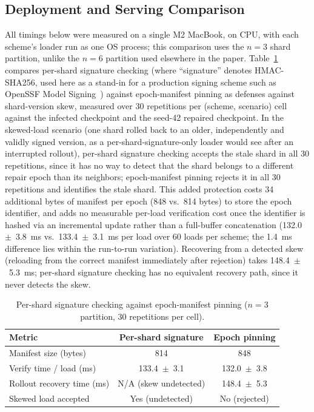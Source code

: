 \documentclass[conference,a4paper]{IEEEtran}  %
\begin{document}
\subsection{Deployment and Serving Comparison}
\label{sec:serving}
All timings below were measured on a single M2 MacBook, on CPU, with
each scheme's loader run as one OS process; this
comparison uses the $n=3$ shard partition, unlike the $n=6$ partition
used elsewhere in the paper. Table~\ref{tab:serving} compares
per-shard signature checking (where ``signature'' denotes
HMAC-SHA256, used here as a stand-in for a production signing
scheme such as OpenSSF Model Signing~\cite{oms2025}) against
epoch-manifest pinning as defenses against
shard-version skew, measured over 30 repetitions per (scheme,
scenario) cell against the infected checkpoint and the seed-42 repaired checkpoint.
In the skewed-load scenario (one shard rolled back
to an older, independently and validly signed version, as a
per-shard-signature-only loader would see after an interrupted rollout),
per-shard signature checking accepts the stale shard in all 30 repetitions,
since it has no way to detect that the shard belongs to a different repair
epoch than its neighbors; epoch-manifest pinning rejects it in all 30
repetitions and identifies the stale shard.
This added
protection costs 34 additional bytes of manifest per epoch (848 vs.\ 814
bytes) to store the epoch identifier, and adds no measurable per-load
verification cost once the identifier is hashed via an incremental update
rather than a full-buffer concatenation (132.0~$\pm$~3.8~ms vs.\
133.4~$\pm$~3.1~ms per load over 60 loads per scheme; the 1.4~ms
difference lies within the run-to-run variation). Recovering from a detected skew (reloading from the
correct manifest immediately after rejection) takes 148.4~$\pm$~5.3~ms;
per-shard signature checking has no equivalent recovery path, since it
never detects the skew.
\begin{table}[h]
\centering
\caption{Per-shard signature checking against epoch-manifest pinning ($n=3$ partition, 30 repetitions per cell).}
\label{tab:serving}
\begin{tabular}{lcc}
\toprule
Metric & Per-shard signature & Epoch pinning \\
\midrule
Manifest size (bytes) & 814 & 848 \\
Verify time / load (ms) & 133.4~$\pm$~3.1 & 132.0~$\pm$~3.8 \\
Rollout recovery time (ms) & N/A (skew undetected) & 148.4~$\pm$~5.3 \\
Skewed load accepted & Yes (undetected) & No (rejected) \\
\bottomrule
\end{tabular}
\end{table}
\end{document}
